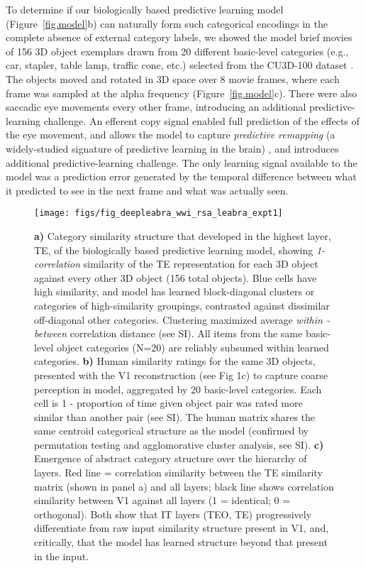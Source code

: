 \documentclass[11pt,twoside]{article}
\newif\myifpdf
\begin{document}
To determine if our biologically based predictive learning model (Figure~\ref{fig.model}b) can naturally form such categorical encodings in the complete absence of external category labels, we showed the model brief movies of 156 3D object exemplars drawn from 20 different basic-level categories (e.g., car, stapler, table lamp, traffic cone, etc.) selected from the CU3D-100 dataset \cite{OReillyWyatteHerdEtAl13}.  The objects moved and rotated in 3D space over 8 movie frames, where each frame was sampled at the alpha frequency (Figure~\ref{fig.model}c).  There were also saccadic eye movements every other frame, introducing an additional predictive-learning challenge.  An efferent copy signal enabled full prediction of the effects of the eye movement, and allows the model to capture \emph{predictive remapping} (a widely-studied signature of predictive learning in the brain) \cite{DuhamelColbyGoldberg92,CavanaghHuntAfrazEtAl10}, and introduces additional predictive-learning challenge.  The only learning signal available to the model was a prediction error generated by the temporal difference between what it predicted to see in the next frame and what was actually seen.

\begin{figure}
  \centering\texttt{[image: figs/fig\_deepleabra\_wwi\_rsa\_leabra\_expt1]}
  \caption{{\bf a)} Category similarity structure that developed in the highest layer, TE, of the biologically based predictive learning model, showing \emph{1-correlation} similarity of the TE representation for each 3D object against every other 3D object (156 total objects). Blue cells have high similarity, and model has learned block-diagonal clusters or categories of high-similarity groupings, contrasted against dissimilar off-diagonal other categories.  Clustering maximized average \emph{within - between} correlation distance (see SI).  All items from the same basic-level object categories (N=20) are reliably subsumed within learned categories. {\bf b)} Human similarity ratings for the same 3D objects, presented with the V1 reconstruction (see Fig 1c) to capture coarse perception in model, aggregated by 20 basic-level categories.  Each cell is 1 - proportion of time given object pair was rated more similar than another pair (see SI).  The human matrix shares the same centroid categorical structure as the model (confirmed by permutation testing and agglomorative cluster analysis, see SI).  {\bf c)} Emergence of abstract category structure over the hierarchy of layers.  Red line = correlation similarity between the TE similarity matrix (shown in panel a) and all layers; black line shows correlation similarity between V1 against all layers (1 = identical; 0 = orthogonal). Both show that IT layers (TEO, TE) progressively differentiate from raw input similarity structure present in V1, and, critically, that the model has learned structure beyond that present in the input.}
  \label{fig.rsa}
\end{figure}
\end{document}
